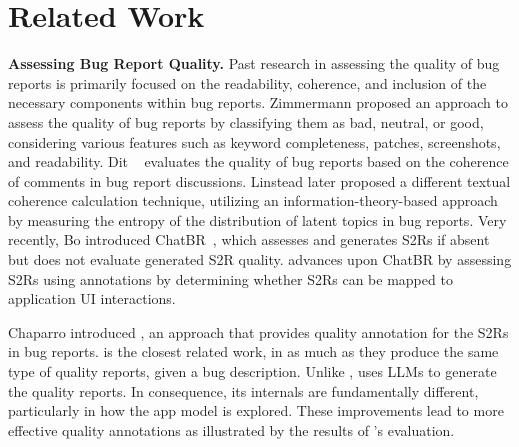 
\section{Related Work}
\label{sec:related_work}


\textbf{Assessing Bug Report Quality.} 
Past research in assessing the quality of bug reports is primarily focused on the readability, coherence, and inclusion of the necessary components within bug reports. Zimmermann \cite{Zimmermann2010} proposed an approach to assess the quality of bug reports by classifying them as bad, neutral, or good, considering various features such as keyword completeness, patches, screenshots, and readability.
Dit  \etal~\cite{Dit2008} evaluates the quality of bug reports based on the coherence of comments in bug report discussions.  
Linstead  \etal \cite{Linstead2009} later proposed a different textual coherence calculation technique, utilizing an information-theory-based approach by measuring the entropy of the distribution of latent topics in bug reports. 
Very recently, Bo  \etal introduced ChatBR~\cite{Bo2024}, which assesses and generates S2Rs if absent but does not evaluate generated S2R quality. \tool advances upon ChatBR by assessing S2Rs using annotations by determining whether S2Rs can be mapped to application UI interactions.

Chaparro  \etal \cite{Chaparro2019} introduced \EulerC, an approach that provides quality annotation for the S2Rs in bug reports.
\EulerC is the closest related work, in as much as they produce the same type of quality reports, given a bug description.
Unlike \EulerC, \tool uses LLMs to generate the quality reports. In consequence, its internals are fundamentally different, particularly in how the app model is explored. These improvements lead to more effective quality annotations as illustrated by the results of \tool's evaluation.  

